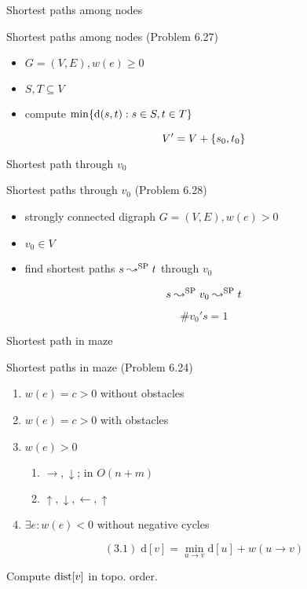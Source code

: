 \begin{frame}{Shortest paths among nodes}
  \begin{exampleblock}{Shortest paths among nodes (Problem 6.27)}
	\begin{itemize}
	  \item $G = (V, E), w(e) \ge 0$ 
	  \item $S, T \subseteq V$
	  \item compute $\min \{\text{d}(s,t): s \in S, t \in T\}$
	\end{itemize}
  \end{exampleblock}

  \[
	V' = V + \{s_0, t_0\}
  \]
\end{frame}
\begin{frame}{Shortest path through $v_0$}
  \begin{exampleblock}{Shortest paths through $v_0$ (Problem 6.28)}
	\begin{itemize}
	  \item strongly connected digraph $G = (V, E), w(e) > 0$
	  \item $v_0 \in V$
	  \item find shortest paths $s \leadsto^{\text{SP}} t$ through $v_0$
	\end{itemize}
  \end{exampleblock}

  \[
	s \leadsto^{\text{SP}} v_0 \leadsto^{\text{SP}} t
  \]

  \[
	\# v_0's = 1
  \]
\end{frame}
\begin{frame}{Shortest path in maze}
  \begin{exampleblock}{Shortest paths in maze (Problem 6.24)}
	\begin{enumerate}
	  \item $w(e) = c > 0$ without obstacles
	  \item $w(e) = c > 0$ with obstacles
	  \item $w(e) > 0$
		\begin{enumerate}
		  \item $\rightarrow, \downarrow$; in $O(n + m)$
		  \item $\uparrow, \downarrow, \leftarrow, \uparrow$
		\end{enumerate}
	  \item $\exists e: w(e) < 0$ without negative cycles
	\end{enumerate}
  \end{exampleblock}

  \[
	(3.1)\; \text{d}[v] = \min_{u \to v} \text{d}[u] + w(u \to v)
  \]

  \centerline{Compute $\text{dist}[v]$ in topo. order.}
\end{frame}
